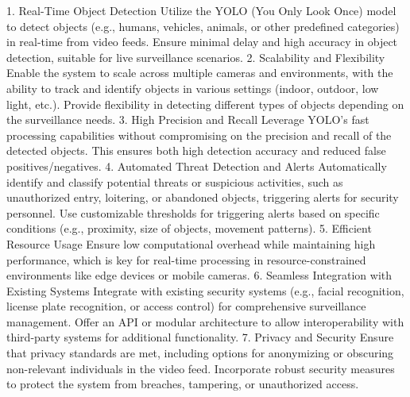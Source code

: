\documentclass[openany,12pt]{report}
\begin{document}
\hspace*{0.5in}1. Real-Time Object Detection
Utilize the YOLO (You Only Look Once) model to detect objects (e.g., humans, vehicles, animals, or other predefined categories) in real-time from video feeds.
Ensure minimal delay and high accuracy in object detection, suitable for live surveillance scenarios.\newline
\hspace*{0.5in}2. Scalability and Flexibility
Enable the system to scale across multiple cameras and environments, with the ability to track and identify objects in various settings (indoor, outdoor, low light, etc.).
Provide flexibility in detecting different types of objects depending on the surveillance needs.\newline
\hspace*{0.5in}3. High Precision and Recall
Leverage YOLO’s fast processing capabilities without compromising on the precision and recall of the detected objects. This ensures both high detection accuracy and reduced false positives/negatives.\newline
\hspace*{0.5in}4. Automated Threat Detection and Alerts
Automatically identify and classify potential threats or suspicious activities, such as unauthorized entry, loitering, or abandoned objects, triggering alerts for security personnel.
Use customizable thresholds for triggering alerts based on specific conditions (e.g., proximity, size of objects, movement patterns).\newline
\hspace*{0.5in}5. Efficient Resource Usage
Ensure low computational overhead while maintaining high performance, which is key for real-time processing in resource-constrained environments like edge devices or mobile cameras.\newline
\hspace*{0.5in}6. Seamless Integration with Existing Systems
Integrate with existing security systems (e.g., facial recognition, license plate recognition, or access control) for comprehensive surveillance management.
Offer an API or modular architecture to allow interoperability with third-party systems for additional functionality.\newline
\hspace*{0.5in}7. Privacy and Security\newline
Ensure that privacy standards are met, including options for anonymizing or obscuring non-relevant individuals in the video feed.
Incorporate robust security measures to protect the system from breaches, tampering, or unauthorized access.\newline
\end{document}
